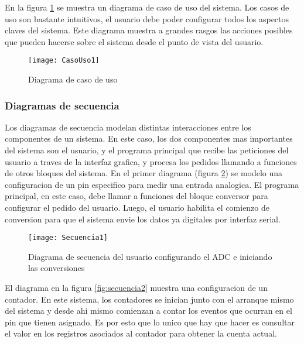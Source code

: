 En la figura \ref{fig:casouso1} se muestra un diagrama de caso de uso del sistema. Los casos de uso son bastante intuitivos, el usuario debe poder configurar todos los aspectos claves del sistema. Este diagrama muestra a grandes rasgos las acciones posibles que pueden hacerse sobre el sistema desde el punto de vista del usuario.

\begin{figure}[h]
  \centering
  \texttt{[image: CasoUso1]}
  \caption{Diagrama de caso de uso}\label{fig:casouso1}
\end{figure}


\subsubsection{Diagramas de secuencia} %
\label{ssub:diagramas_de_secuencia}

Los diagramas de secuencia modelan distintas interacciones entre los componentes de un sistema. En este caso, los dos componentes mas importantes del sistema son el usuario, y el programa principal que recibe las peticiones del usuario a traves de la interfaz grafica, y procesa los pedidos llamando a funciones de otros bloques del sistema. En el primer diagrama (figura \ref{fig:secuencia1}) se modelo una configuracion de un pin especifico para medir una entrada analogica. El programa principal, en este caso, debe llamar a funciones del bloque conversor para configurar el pedido del usuario. Luego, el usuario habilita el comienzo de conversion para que el sistema envie los datos ya digitales por interfaz serial.


\begin{figure}[h]
  \centering
  \texttt{[image: Secuencia1]}
  \caption{Diagrama de secuencia del usuario configurando el ADC e iniciando las conversiones}\label{fig:secuencia1}
\end{figure}

El diagrama en la figura \ref{fig:secuencia2} muestra una configuracion de un contador. En este sistema, los contadores se inician junto con el arranque mismo del sistema y desde ahi mismo comienzan a contar los eventos que ocurran en el pin que tienen asignado. Es por esto que lo unico que hay que hacer es consultar el valor en los registros asociados al contador para obtener la cuenta actual.


